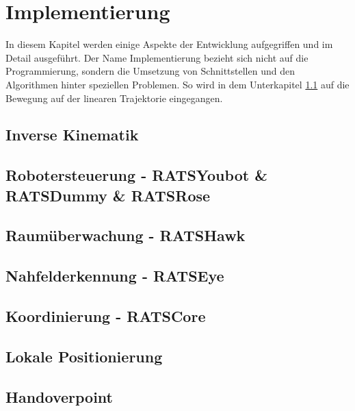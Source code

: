 \section{Implementierung}
\label{sec:impl}

In diesem Kapitel werden einige Aspekte der Entwicklung aufgegriffen und im Detail ausgeführt. Der Name Implementierung bezieht sich nicht auf die Programmierung, sondern die Umsetzung von Schnittstellen und den Algorithmen hinter speziellen Problemen. So wird in dem Unterkapitel \ref{sec:impl-ik} auf die Bewegung auf der linearen Trajektorie eingegangen.

\subsection{Inverse Kinematik}
\label{sec:impl-ik}
\subsection{Robotersteuerung - RATSYoubot \& RATSDummy \& RATSRose}
\subsection{Raumüberwachung - RATSHawk}
\subsection{Nahfelderkennung - RATSEye}
\subsection{Koordinierung - RATSCore}
\subsection{Lokale Positionierung}
\subsection{Handoverpoint}
